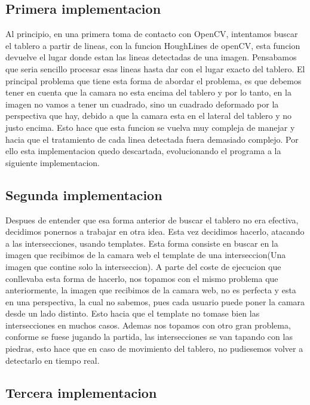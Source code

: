 \documentclass[12pt,a4paper]{report}
\begin{document}
\subsection{Primera implementacion}
 Al principio, en una primera toma de contacto con OpenCV, intentamos buscar el tablero a partir de lineas, con la funcion HoughLines de openCV, esta funcion devuelve el lugar donde estan las lineas detectadas de una imagen. Pensabamos que seria sencillo procesar esas lineas hasta dar con el lugar exacto del tablero.
 El principal problema que tiene esta forma de abordar el problema, es que debemos tener en cuenta que la camara no esta encima del tablero y por lo tanto, en la imagen no vamos a tener un cuadrado, sino un cuadrado deformado por la perspectiva que hay, debido a que la camara esta en el lateral del tablero y no justo encima. Esto hace que esta funcion se vuelva muy compleja de manejar y hacia que el tratamiento de cada linea detectada fuera demasiado complejo. Por ello esta implementacion quedo descartada, evolucionando el programa a la siguiente implementacion.
 
\subsection{Segunda implementacion}

Despues de entender que esa forma anterior de buscar el tablero no era efectiva, decidimos ponernos a trabajar en otra idea. Esta vez decidimos hacerlo, atacando a las intersecciones, usando templates.
Esta forma consiste en buscar en la imagen que recibimos de la camara web el template de una interseccion(Una imagen que contine solo la interseccion).
A parte del coste de ejecucion que conllevaba esta forma de hacerlo, nos topamos con el mismo problema que anteriormente, la imagen que recibimos de la camara web, no es perfecta y esta en una perspectiva, la cual no sabemos, pues cada usuario puede poner la camara desde un lado distinto. Esto hacia que el template no tomase bien las intersecciones en muchos casos.
Ademas nos topamos con otro gran problema, conforme se fuese jugando la partida, las intersecciones se van tapando con las piedras, esto hace que en caso de movimiento del tablero, no pudiesemos volver a detectarlo en tiempo real.


\subsection{Tercera implementacion}
\end{document}
